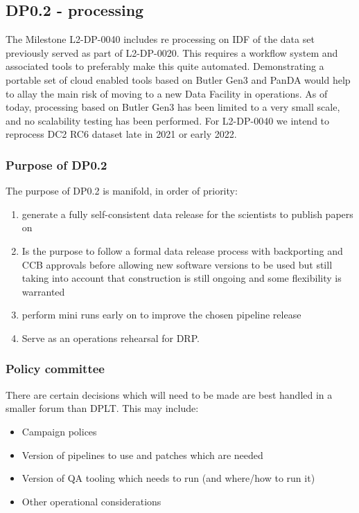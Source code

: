 \subsection{DP0.2 - processing} \label{sec:dp0.2}

The Milestone L2-DP-0040 includes re processing on IDF of the data set previously served as part of L2-DP-0020.
This requires a workflow system and associated tools to preferably make this quite automated.
Demonstrating a portable set of cloud enabled tools based on Butler Gen3 and PanDA would help to allay the main risk of moving to a new Data Facility in operations.
As of today, processing based on Butler Gen3 has been limited to a very small scale, and no scalability testing has been performed. For L2-DP-0040 we intend to reprocess DC2 RC6  dataset late in 2021 or early 2022.

\subsubsection {Purpose of DP0.2}
The purpose of DP0.2 is manifold, in order of priority:
\begin{enumerate}
	\item generate a fully self-consistent data release for the scientists to publish papers on
	\item Is the purpose to follow a formal data release process with backporting and CCB approvals before allowing new software versions to be used but still taking into account that construction is still ongoing and some flexibility is warranted
	\item perform mini runs early on to improve the chosen pipeline release

	\item Serve as an operations rehearsal for DRP.
\end{enumerate}


\subsubsection {Policy committee} \label{sec:policy}

There are certain decisions which will need to be made are best handled in a smaller forum than DPLT.
This may include:

\begin{itemize}
\item Campaign polices
\item Version of pipelines to use and patches which are needed
\item Version of QA tooling which needs to run (and where/how to run it)
\item Other operational considerations
\end{itemize}

